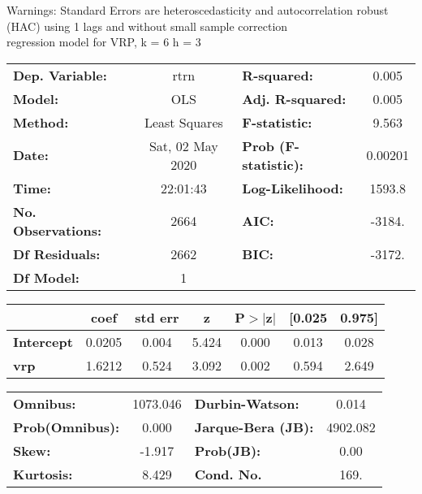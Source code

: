 Warnings: \newline
 [1] Standard Errors are heteroscedasticity and autocorrelation robust (HAC) using 1 lags and without small sample correction\\ 

regression model for VRP, k = 6 h = 3\begin{center}
\begin{tabular}{lclc}
\toprule
\textbf{Dep. Variable:}    &       rtrn       & \textbf{  R-squared:         } &     0.005   \\
\textbf{Model:}            &       OLS        & \textbf{  Adj. R-squared:    } &     0.005   \\
\textbf{Method:}           &  Least Squares   & \textbf{  F-statistic:       } &     9.563   \\
\textbf{Date:}             & Sat, 02 May 2020 & \textbf{  Prob (F-statistic):} &  0.00201    \\
\textbf{Time:}             &     22:01:43     & \textbf{  Log-Likelihood:    } &    1593.8   \\
\textbf{No. Observations:} &        2664      & \textbf{  AIC:               } &    -3184.   \\
\textbf{Df Residuals:}     &        2662      & \textbf{  BIC:               } &    -3172.   \\
\textbf{Df Model:}         &           1      & \textbf{                     } &             \\
\bottomrule
\end{tabular}
\begin{tabular}{lcccccc}
                   & \textbf{coef} & \textbf{std err} & \textbf{z} & \textbf{P$> |$z$|$} & \textbf{[0.025} & \textbf{0.975]}  \\
\midrule
\textbf{Intercept} &       0.0205  &        0.004     &     5.424  &         0.000        &        0.013    &        0.028     \\
\textbf{vrp}       &       1.6212  &        0.524     &     3.092  &         0.002        &        0.594    &        2.649     \\
\bottomrule
\end{tabular}
\begin{tabular}{lclc}
\textbf{Omnibus:}       & 1073.046 & \textbf{  Durbin-Watson:     } &    0.014  \\
\textbf{Prob(Omnibus):} &   0.000  & \textbf{  Jarque-Bera (JB):  } & 4902.082  \\
\textbf{Skew:}          &  -1.917  & \textbf{  Prob(JB):          } &     0.00  \\
\textbf{Kurtosis:}      &   8.429  & \textbf{  Cond. No.          } &     169.  \\
\bottomrule
\end{tabular}
\end{center}

